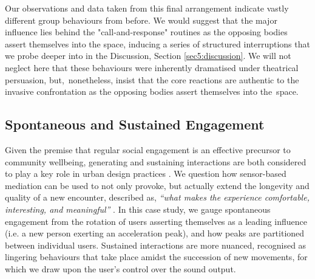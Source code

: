 Our observations and data taken from this final arrangement indicate vastly different group behaviours from before. We would suggest that the major influence lies behind the "call-and-response" routines as the opposing bodies assert themselves into the space, inducing a series of structured interruptions that we probe deeper into in the Discussion, Section \ref{sec5:discussion}. We will not neglect here that these behaviours were inherently dramatised under theatrical persuasion, but,~nonetheless, insist that the core reactions are authentic to the invasive confrontation as the opposing bodies assert themselves into the~space.

\subsection*{Spontaneous and Sustained Engagement}

Given the premise that regular social engagement is an effective precursor to community wellbeing, generating and sustaining interactions are both considered to play a key role in urban design practices \citep{latham_social_2019,okkels_urban_2018,mehta_look_2009}. We question how sensor-based mediation can be used to not only provoke, but actually extend the longevity and quality of a new encounter, described as, \textit{``what makes the experience comfortable, interesting, and meaningful''} \citep{mehta_look_2009}. In this case study, we gauge spontaneous engagement from the rotation of users asserting themselves as a leading influence (i.e. a new person exerting an acceleration peak), and how peaks are partitioned between individual users. Sustained interactions are more nuanced, recognised as lingering behaviours that take place amidst the succession of new movements, for which we draw upon the user's control over the sound output.

